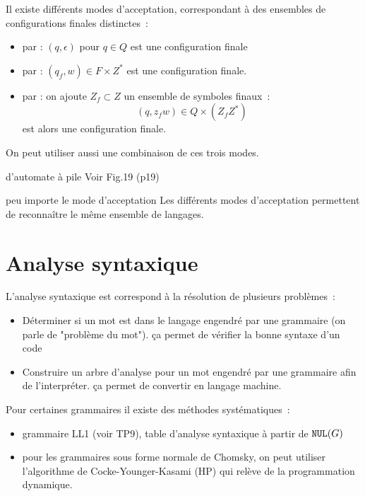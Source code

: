 \begin{adjustwidth}{-3cm}{-3cm}
Il existe différents modes d'acceptation, correspondant à des ensembles de configurations finales distinctes~:
\begin{itemize}
    \item par  : $(q,\epsilon)$ pour $q \in Q$ est une configuration finale
    \item par  : $(q_f, w) \in F \times Z^*$ est une configuration finale.
    \item par  : on ajoute $Z_f \subset Z$ un ensemble de symboles finaux~:
    $$(q, z_fw) \in Q \times (Z_fZ^*)$$
    est alors une configuration finale.
\end{itemize}
On peut utiliser aussi une combinaison de ces trois modes.

\begin{exemple}{}{d'automate à pile}
    Voir Fig.19 (p19)
\end{exemple}

\begin{proposition}{}{peu importe le mode d'acceptation}
    Les différents modes d'acceptation permettent de reconnaître le même ensemble de langages.
\end{proposition}

\section{Analyse syntaxique}

L'analyse syntaxique est correspond à la résolution de plusieurs problèmes~:
\begin{itemize}
    \item Déterminer si un mot est dans le langage engendré par une grammaire (on parle de "problème du mot"). ça permet de vérifier la bonne syntaxe d'un code
    \item Construire un arbre d'analyse pour un mot engendré par une grammaire afin de l'interpréter. ça permet de convertir en langage machine.
\end{itemize}

Pour certaines grammaires il existe des méthodes systématiques~:
\begin{itemize}
    \item grammaire LL1 (voir TP9), table d'analyse syntaxique à partir de $\texttt{NUL}(G)$
    \item pour les grammaires sous forme normale de Chomsky, on peut utiliser l'algorithme de Cocke-Younger-Kasami (HP) qui relève de la programmation dynamique.
\end{itemize}


\end{adjustwidth}
